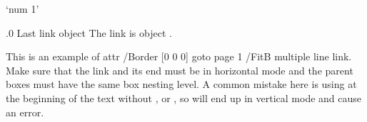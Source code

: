 {       %
`num 1'%
\pdfendlink             %
}

.0 {Last link object}
The link is object \the\pdflastlink.
\endfeature






{ \raggedright \noindent
    This is an example of
    \pdfstartlink
        attr{ /Border [0 0 0]}  %
        goto page 1 {/FitB}%
    \Red multiple line link. Make sure that the link and
    its end must be in horizontal mode and the parent boxes must have the
    same box nesting level.\Black
    \pdfendlink
    A common mistake here is using \cs{\pdfstartlink} at the
    beginning of the text without \cs{\indent}, \cs{\noindent}
    or \cs{\leavevmode}, so \cs{\pdfstartlink}
    will end up in vertical mode and cause an error.
    \par}

